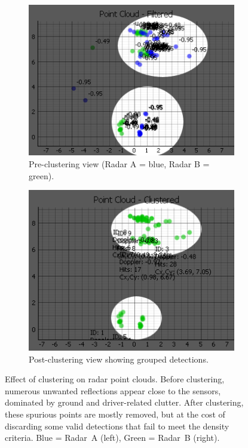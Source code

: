 \begin{figure}[!htbp]
    \centering
    \begin{subfigure}{0.45\linewidth}
        \centering
        \includegraphics[width=\linewidth]{images/pre_cluster_example.png}
        \caption{Pre-clustering view (Radar A = blue, Radar B = green).}
        \label{fig:pre_cluster_example}
    \end{subfigure}
    \hfill
    \begin{subfigure}{0.45\linewidth}
        \centering
        \includegraphics[width=\linewidth]{images/post_cluster_example.png}
        \caption{Post-clustering view showing grouped detections.}
        \label{fig:post_cluster_example}
    \end{subfigure}
    \caption{Effect of clustering on radar point clouds.  
    Before clustering, numerous unwanted reflections appear close to the sensors, dominated by ground and driver-related clutter.  
    After clustering, these spurious points are mostly removed, but at the cost of discarding some valid detections that fail to meet the density criteria.  
    Blue = Radar~A (left), Green = Radar~B (right).}
    \label{fig:cluster_loss_effect}
\end{figure}



